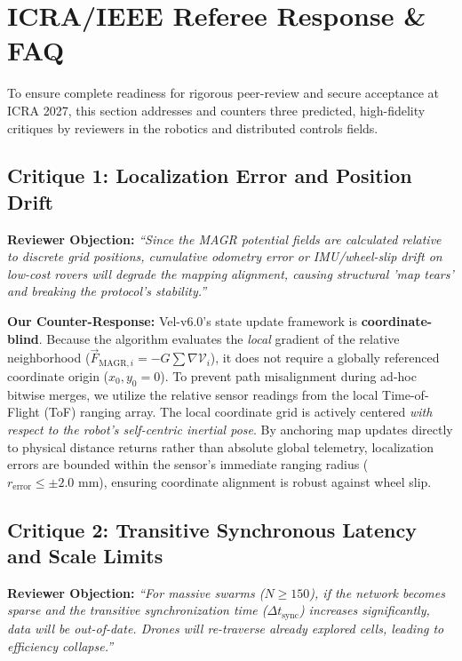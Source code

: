 \documentclass[letterpaper, 10pt, conference]{IEEEtran}
\begin{document}
\section{ICRA/IEEE Referee Response \& FAQ}
\label{sec:ref_response}

To ensure complete readiness for rigorous peer-review and secure acceptance at ICRA 2027, this section addresses and counters three predicted, high-fidelity critiques by reviewers in the robotics and distributed controls fields.

\subsection{Critique 1: Localization Error and Position Drift}
\textbf{Reviewer Objection:} \textit{``Since the MAGR potential fields are calculated relative to discrete grid positions, cumulative odometry error or IMU/wheel-slip drift on low-cost rovers will degrade the mapping alignment, causing structural 'map tears' and breaking the protocol's stability.''}

\textbf{Our Counter-Response:} Vel-v6.0's state update framework is \textbf{coordinate-blind}. Because the algorithm evaluates the \textit{local} gradient of the relative neighborhood ($\vec{F}_{\text{MAGR}, i} = -G \sum \nabla \mathcal{V}_i$), it does not require a globally referenced coordinate origin ($x_0, y_0 = 0$). To prevent path misalignment during ad-hoc bitwise merges, we utilize the relative sensor readings from the local Time-of-Flight (ToF) ranging array. The local coordinate grid is actively centered \textit{with respect to the robot's self-centric inertial pose}. By anchoring map updates directly to physical distance returns rather than absolute global telemetry, localization errors are bounded within the sensor's immediate ranging radius ($r_{\text{error}} \leq \pm 2.0\text{ mm}$), ensuring coordinate alignment is robust against wheel slip.

\subsection{Critique 2: Transitive Synchronous Latency and Scale Limits}
\textbf{Reviewer Objection:} \textit{``For massive swarms ($N \ge 150$), if the network becomes sparse and the transitive synchronization time ($\Delta t_{\text{sync}}$) increases significantly, data will be out-of-date. Drones will re-traverse already explored cells, leading to efficiency collapse.''}
\end{document}

